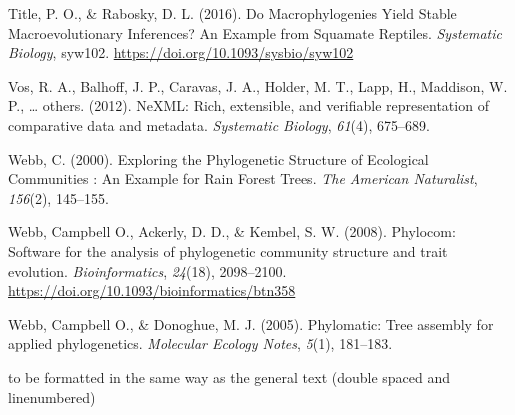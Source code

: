 \documentclass[
  english,
  man]{apa6}
\newlength{\cslhangindent}
\newlength{\cslentryspacingunit} %
\newenvironment{CSLReferences}[2] %
 {%
  \setlength{\parindent}{0pt}
  \ifodd #1
  \let\oldpar\par
  \def\par{\hangindent=\cslhangindent\oldpar}
  \fi
  \setlength{\parskip}{#2\cslentryspacingunit}
 }%
 {}
\begin{document}
\begin{CSLReferences}{1}{0}
\leavevmode{}%
Title, P. O., \& Rabosky, D. L. (2016). {Do Macrophylogenies Yield Stable Macroevolutionary Inferences? An Example from Squamate Reptiles}. \emph{Systematic Biology}, syw102. \url{https://doi.org/10.1093/sysbio/syw102}

\leavevmode{}%
Vos, R. A., Balhoff, J. P., Caravas, J. A., Holder, M. T., Lapp, H., Maddison, W. P., \ldots{} others. (2012). NeXML: Rich, extensible, and verifiable representation of comparative data and metadata. \emph{Systematic Biology}, \emph{61}(4), 675--689.

\leavevmode{}%
Webb, C. (2000). {Exploring the Phylogenetic Structure of Ecological Communities : An Example for Rain Forest Trees}. \emph{{The American Naturalist}}, \emph{156}(2), 145--155.

\leavevmode{}%
Webb, Campbell O., Ackerly, D. D., \& Kembel, S. W. (2008). {Phylocom: Software for the analysis of phylogenetic community structure and trait evolution}. \emph{Bioinformatics}, \emph{24}(18), 2098--2100. \url{https://doi.org/10.1093/bioinformatics/btn358}

\leavevmode{}%
Webb, Campbell O., \& Donoghue, M. J. (2005). Phylomatic: Tree assembly for applied phylogenetics. \emph{{Molecular Ecology Notes}}, \emph{5}(1), 181--183.

\end{CSLReferences}

\endgroup


to be formatted in the same way as the general text (double spaced and linenumbered)
\end{document}
